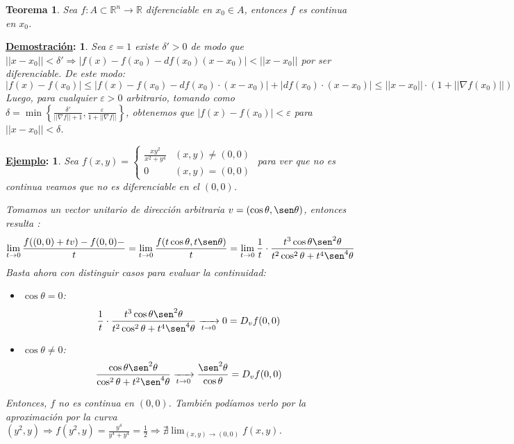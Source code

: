 \documentclass[10pt,a4paper,openright]{book}
\theoremstyle{break}
\newtheorem*{theo}{Teorema}
\newtheorem*{demo}{\underline{Demostración}:}
\newtheorem*{ej}{\underline{Ejemplo}:}
\begin{document}
\begin{theo}
Sea $f: A \subset \mathbb{R}^n \to \mathbb{R}$ diferenciable en $x_0 \in A$, entonces $f$ es continua en $x_0$.
\end{theo}
\begin{demo}
Sea $\varepsilon = 1$ existe $\delta' > 0$ de modo que $|| x - x_0 || < \delta' \Rightarrow |f(x) - f(x_0) - d f(x_0) (x - x_0)| < || x - x_0 ||$ por ser diferenciable. De este modo:
$$|f(x) - f(x_0)| \leq |f(x) - f(x_0) - df(x_0)\cdot (x - x_0)| + |df(x_0) \cdot (x - x_0)| \leq ||x-x_0|| \cdot (1 + || \nabla f(x_0) ||)$$
Luego, para cualquier $\varepsilon > 0$ arbitrario, tomando como $\delta = \min\left\lbrace \frac{\delta'}{||\nabla f || + 1}, \frac{\varepsilon}{1 + || \nabla f||}\right\rbrace$, obtenemos que $|f(x) - f(x_0)| < \varepsilon$ para $||x - x_0|| < \delta$.
\end{demo}

\begin{ej}
Sea $f(x,y) = \begin{cases} \frac{xy^2}{x^2 + y^4} & (x,y) \neq (0,0) \\ 0 & (x,y) = (0,0) \end{cases}$ para ver que no es continua veamos que no es diferenciable en el $(0,0)$.

Tomamos un vector unitario de dirección arbitraria $v = (\cos\theta , \sen\theta)$, entonces resulta :
$$\lim_{t\rightarrow 0}\frac{f((0,0) + tv) - f(0,0) -}{t}=\lim_{t\rightarrow 0} \frac{f(t\cos\theta, t \sen\theta)}{t} =\lim_{t\rightarrow 0} \frac{1}{t} \cdot \frac{t^3 \cos\theta \sen^2 \theta}{t^2 \cos^2 \theta + t^4 \sen^4 \theta}$$
Basta ahora con distinguir casos para evaluar la continuidad:
	\begin{itemize}
		\item $\cos\theta = 0$:
		$$\frac{1}{t} \cdot \frac{t^3 \cos\theta \sen^2 \theta}{t^2 \cos^2 \theta + t^4 \sen^4 \theta} \xrightarrow[t \to 0]{} 0 = D_v f(0,0)$$
		\item $\cos\theta \neq 0$:
		$$\frac{\cos\theta \sen^2\theta}{\cos^2 \theta + t^2 \sen^4 \theta} \xrightarrow[t \to 0]{} \frac{\sen^2 \theta}{\cos\theta} = D_v f(0,0)$$
\end{itemize}

Entonces, $f$ no es continua en $(0,0)$. También podíamos verlo por la aproximación por la curva $(y^2,y)\Rightarrow f(y^2, y) = \frac{y^4}{y^4 + y^4} = \frac{1}{2} \Rightarrow \nexists \lim_{(x,y) \to (0,0)} f(x,y)$.
\end{ej}
\end{document}
